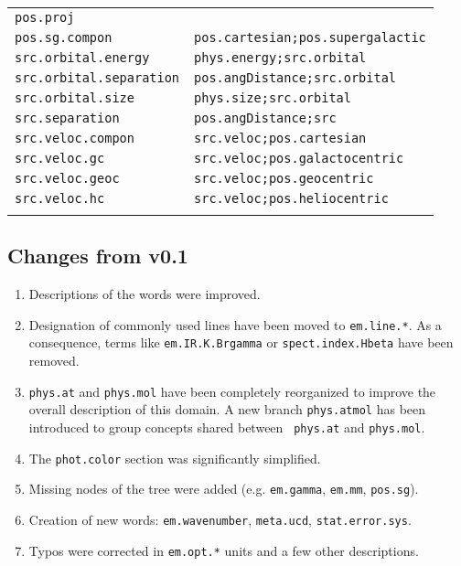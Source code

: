 \documentclass[11pt,a4paper]{ivoa}
\begin{document}
\begin{enumerate}
\begin{longtable}{|l|l|}
{\tt pos.proj} & \\
{\tt pos.sg.compon} & {\tt pos.cartesian;pos.supergalactic}\\
{\tt src.orbital.energy} & {\tt phys.energy;src.orbital}\\
{\tt src.orbital.separation} & {\tt pos.angDistance;src.orbital}\\
{\tt src.orbital.size} & {\tt phys.size;src.orbital}\\
{\tt src.separation} & {\tt pos.angDistance;src}\\
{\tt src.veloc.compon} & {\tt src.veloc;pos.cartesian}\\ 
{\tt src.veloc.gc} & {\tt src.veloc;pos.galactocentric}\\
{\tt src.veloc.geoc} & {\tt src.veloc;pos.geocentric}\\
{\tt src.veloc.hc} & {\tt src.veloc;pos.heliocentric}\\
\sptablerule
\end{longtable}
\end{enumerate}

\subsection{Changes from v0.1}
\begin{enumerate}
\item Descriptions of the words were improved.
\item Designation of commonly used lines have been moved to {\tt em.line.*}. As a consequence, terms like 
{\tt em.IR.K.Brgamma} or {\tt spect.index.Hbeta} have been removed.
\item {\tt phys.at} and {\tt phys.mol} have been completely reorganized to improve the overall description 
of this domain. A new branch {\tt phys.atmol} has been introduced to group concepts shared between {\tt 
phys.at} and {\tt phys.mol}.
\item The {\tt phot.color} section was significantly simplified.
\item Missing nodes of the tree were added (e.g. {\tt em.gamma}, {\tt em.mm}, {\tt pos.sg}).
\item Creation of new words: {\tt em.wavenumber}, {\tt meta.ucd}, {\tt stat.error.sys}.
\item Typos were corrected in {\tt em.opt.*} units and a few other descriptions.
\end{enumerate}


\end{document}
